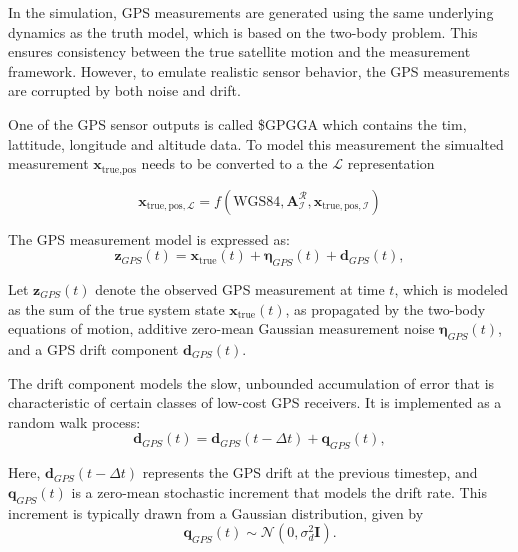 In the simulation, GPS measurements are generated using the same underlying dynamics as the truth model, which is based 
on the two-body problem. This ensures consistency between the true satellite motion and the measurement framework. However, to emulate realistic 
sensor behavior, the GPS measurements are corrupted by both noise and drift.
\vspace{0.5cm}

\noindent One of the GPS sensor outputs is called \$GPGGA which contains the tim, lattitude, longitude and altitude data. To model this measurement 
the simualted measurement $\mathbf{x}_{\text{true},\text{pos}}$ needs to be converted to a the $\mathcal{L}$ representation

\begin{equation}
    \mathbf{x}_{\text{true},\text{pos},\mathcal{L}} = f(\text{WGS84},\mathbf{A}_\mathcal{I}^\mathcal{R},\mathbf{x}_{\text{true},\text{pos},\mathcal{I}})
\end{equation}

\noindent The GPS measurement model is expressed as:
\begin{equation}
    \mathbf{z}_{GPS}(t) = \mathbf{x}_{\text{true}}(t) + \boldsymbol{\eta}_{GPS}(t) + \mathbf{d}_{GPS}(t),
\end{equation}

\noindent Let $\mathbf{z}_{GPS}(t)$ denote the observed GPS measurement at time $t$, which is modeled as the sum of the true system state $\mathbf{x}_{\text{true}}(t)$, 
as propagated by the two-body equations of motion, additive zero-mean Gaussian measurement noise $\boldsymbol{\eta}_{GPS}(t)$, and a GPS drift component $\mathbf{d}_{GPS}(t)$.
\vspace{0.5cm}

\noindent The drift component models the slow, unbounded accumulation of error that is characteristic of certain classes of low-cost GPS receivers. 
It is implemented as a random walk process:
\begin{equation}
    \mathbf{d}_{GPS}(t) = \mathbf{d}_{GPS}(t - \Delta t) + \mathbf{q}_{GPS}(t),
\end{equation}


\noindent Here, $\mathbf{d}_{GPS}(t - \Delta t)$ represents the GPS drift at the previous timestep, and $\mathbf{q}_{GPS}(t)$ is a zero-mean stochastic increment that models the drift rate. This increment is typically drawn from a Gaussian distribution, given by
\begin{equation}
    \mathbf{q}_{GPS}(t) \sim \mathcal{N}(0, \sigma_d^2 \mathbf{I}).
\end{equation}



